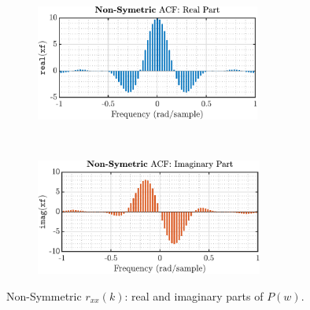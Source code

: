 \begin{enumerate}[label=\alph*), leftmargin=*]
\begin{figure}[h]
    \centering
    \begin{subfigure}{0.49\textwidth}
        \centering
        \includegraphics[height=1.5in]{report/spectrum-estimation/properties-of-power-spectral-density/assets/c/non_symetric_real-M_10}
    \end{subfigure}
    ~ 
    \begin{subfigure}{0.49\textwidth}
        \centering
        \includegraphics[height=1.5in]{report/spectrum-estimation/properties-of-power-spectral-density/assets/c/non_symetric_imag-M_10}
    \end{subfigure}
    \caption{Non-Symmetric $r_{xx}(k)$: real and imaginary parts of $P(w)$.}
    \label{fig:1_2_c_1}
\end{figure}


\end{enumerate}
